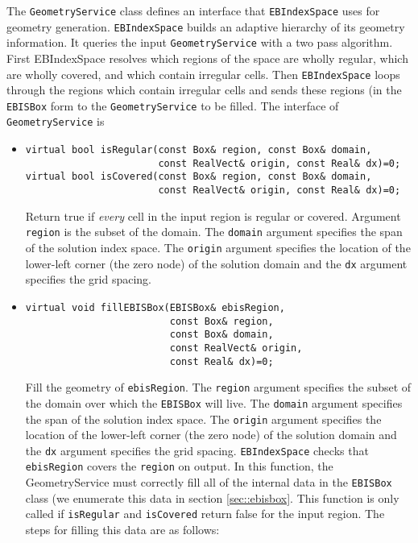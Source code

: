 The {\tt GeometryService} class defines an interface 
that {\tt EBIndexSpace} uses for geometry generation.
{\tt EBIndexSpace} builds an adaptive hierarchy of its
geometry information.  It queries the input {\tt GeometryService} 
with a two pass algorithm.  First EBIndexSpace resolves
which regions of the space are wholly regular, which are wholly
covered, and which contain irregular cells.  Then {\tt EBIndexSpace}
loops through the regions which contain irregular cells and
sends these regions (in the {\tt EBISBox} form to the 
{\tt GeometryService} to be filled.
The interface of {\tt GeometryService} is
\begin{itemize}
\item 
\begin{verbatim}
virtual bool isRegular(const Box& region, const Box& domain,
                       const RealVect& origin, const Real& dx)=0;
virtual bool isCovered(const Box& region, const Box& domain,
                       const RealVect& origin, const Real& dx)=0;
\end{verbatim}
Return true if {\em every} cell in the input region
is regular or covered.  
Argument {\tt region} is the subset of the domain.
The {\tt domain} argument specifies the span of the solution
index space.  The {\tt origin} argument specifies the location of the
lower-left corner (the zero node)
of the solution domain and the {\tt dx} argument 
specifies the grid spacing.
\item
\begin{verbatim}
virtual void fillEBISBox(EBISBox& ebisRegion, 
                         const Box& region,
                         const Box& domain,
                         const RealVect& origin, 
                         const Real& dx)=0;
\end{verbatim}
Fill the geometry of {\tt ebisRegion}.  
The {\tt region} argument specifies the subset of the domain
over which the {\tt EBISBox} will live.
The {\tt domain} argument specifies the span of the solution
index space.  The {\tt origin} argument specifies the location of the
lower-left corner (the zero node)
of the solution domain and the {\tt dx} argument 
specifies the grid spacing.   {\tt EBIndexSpace} checks that 
{\tt ebisRegion} covers the {\tt region} on output.
In this function,  the GeometryService must 
correctly fill all of the internal data in the 
{\tt EBISBox} class (we enumerate this data in section
\ref{sec::ebisbox}.  This function is only called if 
{\tt isRegular} and {\tt isCovered} return false for 
the input region.  The steps  for filling this data are as follows:

\end{itemize}

